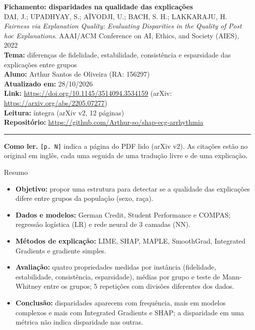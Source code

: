 \documentclass[11pt,a4paper]{article}
\begin{document}
\begin{center}
    {\LARGE \textbf{Fichamento: disparidades na qualidade das explicações}} \\[0.35em]
    {\large DAI, J.; UPADHYAY, S.; AÏVODJI, U.; BACH, S. H.; LAKKARAJU, H. \textit{Fairness via Explanation Quality: Evaluating Disparities in the Quality of Post hoc Explanations}. AAAI/ACM Conference on AI, Ethics, and Society (AIES), 2022} \\[0.3em]
    \textbf{Tema:} diferenças de fidelidade, estabilidade, consistência e esparsidade das explicações entre grupos \\[0.2em]
    \textbf{Aluno:} Arthur Santos de Oliveira (RA: 156297) \\[0.2em]
    \textbf{Atualizado em:} 28/10/2026 \\[0.2em]
    \textbf{Link:} \url{https://doi.org/10.1145/3514094.3534159} (arXiv: \url{https://arxiv.org/abs/2205.07277}) \\[0.2em]
    \textbf{Leitura:} íntegra (arXiv v2, 12 páginas) \\[0.2em]
    \textbf{Repositório:} \url{https://github.com/Arthur-so/shap-ecg-arrhythmia}
\end{center}
\vspace{-0.5em}
\hrule
\vspace{0.8em}

\textbf{Como ler.} \texttt{[p. N]} indica a página do PDF lido (arXiv v2). As citações estão no original em inglês, cada uma seguida de uma tradução livre e de uma explicação.

\begin{infobox}[note]{Resumo}
\begin{itemize}
  \item \textbf{Objetivo:} propor uma estrutura para detectar se a qualidade das explicações difere entre grupos da população (sexo, raça).
  \item \textbf{Dados e modelos:} German Credit, Student Performance e COMPAS; regressão logística (LR) e rede neural de 3 camadas (NN).
  \item \textbf{Métodos de explicação:} LIME, SHAP, MAPLE, SmoothGrad, Integrated Gradients e gradiente simples.
  \item \textbf{Avaliação:} quatro propriedades medidas por instância (fidelidade, estabilidade, consistência, esparsidade), médias por grupo e teste de Mann-Whitney entre os grupos; 5 repetições com divisões diferentes dos dados.
  \item \textbf{Conclusão:} disparidades aparecem com frequência, mais em modelos complexos e mais com Integrated Gradients e SHAP; a disparidade em uma métrica não indica disparidade nas outras.
\end{itemize}
\end{infobox}
\end{document}
